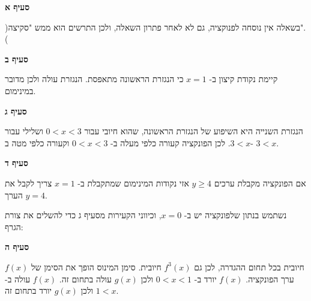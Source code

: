 \vspace{-2ex}

\textbf{סעיף א}

)בשאלה אין נוסחה לפנוקציה, גם לא לאחר פתרון השאלה, ולכן התרשים הוא ממש "סקיצה".(

\begin{center}
\end{center}

\textbf{סעיף ב}

קיימת נקודת קיצון ב-%
$x=1$
כי הנגזרת הראשונה מתאפסת. הנגזרת עולה ולכן מדובר במינימום.


\textbf{סעיף ג}

הנגזרת השנייה היא השיפוע של הנגזרת הראשונה, שהוא חיובי עבור
$0<x<3$
ושלילי עבור
$3<x$.
לכן הפונקציה קעורה כלפי מעלה ב-%
$0<x<3$
וקעורה כלפי מטה ב-%
$3<x$.


\textbf{סעיף ד}

אם הפונקציה מקבלת ערכים 
$y\geq 4$
אזי נקודות המינימום שמתקבלת ב-%
$x=1$
צריך לקבל את הערך
$y=4$.

נשתמש בנתון שלפונקציה יש 
\asm{}
ב-%
$x=0$,
וכיווני הקעירות מסעיף ג כדי להשלים את צורת הגרף:

\begin{center}
\end{center}


\textbf{סעיף ה}

$f(x)$
חיובית בכל תחום ההגדרה, לכן גם
$f^3(x)$
חיובית. סימן המינוס הופך את הסימן של ערך הפונקציה. 
$f(x)$
יורד ב-%
$0<x<1$
ולכן 
$g(x)$
עולה בתחום זה.
$f(x)$
עולה ב-%
$1<x$
ולכן 
$g(x)$
יורד בתחום זה.

